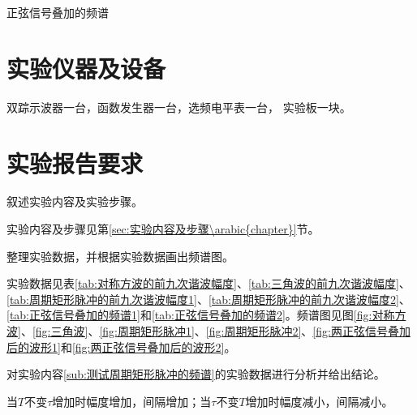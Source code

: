 \begin{enumerate}
		\begin{table}[htpb]
			\centering
			\caption{正弦信号叠加的频谱}
			\label{tab:正弦信号叠加的频谱\arabic{enumi}}
		\end{table}
\end{enumerate}

\section{实验仪器及设备}%
\label{sec:实验仪器及设备\arabic{chapter}}

双踪示波器一台，函数发生器一台，选频电平表一台，  实验板一块。

\section{实验报告要求}%
\label{sec:实验报告要求\arabic{chapter}}

\begin{Exercise}
	叙述实验内容及实验步骤。
\end{Exercise}

\begin{Answer}
	实验内容及步骤见第\ref{sec:实验内容及步骤\arabic{chapter}}节。
\end{Answer}

\begin{Exercise}
	整理实验数据，并根据实验数据画出频谱图。
\end{Exercise}

\begin{Answer}
	实验数据见表\ref{tab:对称方波的前九次谐波幅度}、\ref{tab:三角波的前九次谐波幅度}、\ref{tab:周期矩形脉冲的前九次谐波幅度1}、\ref{tab:周期矩形脉冲的前九次谐波幅度2}、\ref{tab:正弦信号叠加的频谱1}和\ref{tab:正弦信号叠加的频谱2}。频谱图见图\ref{fig:对称方波}、\ref{fig:三角波}、\ref{fig:周期矩形脉冲1}、\ref{fig:周期矩形脉冲2}、\ref{fig:两正弦信号叠加后的波形1}和\ref{fig:两正弦信号叠加后的波形2}。
\end{Answer}

\begin{Exercise}
	对实验内容\ref{sub:测试周期矩形脉冲的频谱}的实验数据进行分析并给出结论。
\end{Exercise}

\begin{Answer}
	当$ T $不变$ \tau $增加时幅度增加，间隔增加；当$ \tau $不变$ T $增加时幅度减小，间隔减小。
\end{Answer}

